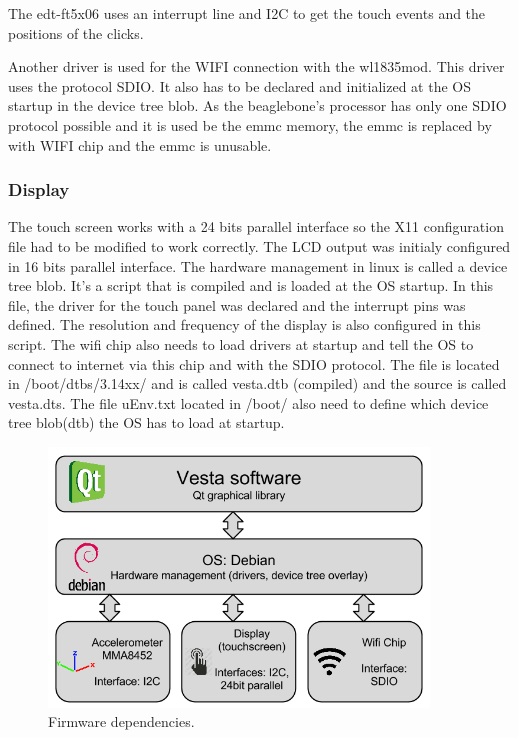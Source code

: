 The edt-ft5x06 uses an interrupt line and I2C to get the touch events and the positions of the clicks.

Another driver is used for the WIFI connection with the wl1835mod. This driver uses the protocol SDIO. It also has to be declared and initialized at the OS startup in the device tree blob. As the beaglebone's processor has only one SDIO protocol possible and it is used be the emmc memory, the emmc is replaced by with WIFI chip and the emmc is unusable.

\subsubsection{Display}
The touch screen works with a 24 bits parallel interface so the X11 configuration file had to be modified to work correctly. The LCD output was initialy configured in 16 bits parallel interface.
The hardware management in linux is called a device tree blob. It’s a script that is compiled and is loaded at the OS startup. In this file, the driver for the touch panel was declared and the interrupt pins was defined. The resolution and frequency of the display is also configured in this script. The wifi chip also needs to load drivers at startup and tell the OS to connect to internet via this chip and with the SDIO protocol.
The file is located in /boot/dtbs/3.14xx/ and is called vesta.dtb (compiled) and the source is called vesta.dts. The file uEnv.txt located in /boot/ also need to define which device tree blob(dtb) the OS has to load at startup.
\begin{figure}[!htb]
    \centering
    \includegraphics[width=0.9\textwidth,keepaspectratio]{chap/softFig/first_diagram2}
    \caption{Firmware dependencies.}
    \label{fig:firmware dependencies}
\end{figure}

